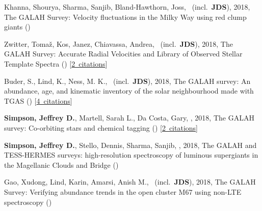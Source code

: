 \item[{\color{numcolor}\scriptsize6}] Khanna, Shourya, Sharma, Sanjib, Bland-Hawthorn, Joss, \etal\ (incl.\ \textbf{JDS}), 2018, The GALAH Survey: Velocity fluctuations in the Milky Way using red clump giants ()

\item[{\color{numcolor}\scriptsize5}] Zwitter, Toma{\v{z}}, Kos, Janez, Chiavassa, Andrea, \etal\ (incl.\ \textbf{JDS}), 2018, The GALAH Survey: Accurate Radial Velocities and Library of Observed Stellar Template Spectra () [\href{https://ui.adsabs.harvard.edu/#abs/2018arXiv180406344Z}{2~citations}]

\item[{\color{numcolor}\scriptsize4}] Buder, S., Lind, K., Ness, M. K., \etal\ (incl.\ \textbf{JDS}), 2018, The GALAH survey: An abundance, age, and kinematic inventory of the solar neighbourhood made with TGAS () [\href{https://ui.adsabs.harvard.edu/#abs/2018arXiv180405869B}{4~citations}]

\item[{\color{numcolor}\scriptsize3}] \textbf{Simpson, Jeffrey D.}, Martell, Sarah L., Da Costa, Gary, \etal, 2018, The GALAH survey: Co-orbiting stars and chemical tagging () [\href{https://ui.adsabs.harvard.edu/#abs/2018arXiv180405894S}{2~citations}]

\item[{\color{numcolor}\scriptsize2}] \textbf{Simpson, Jeffrey D.}, Stello, Dennis, Sharma, Sanjib, \etal, 2018, The GALAH and TESS-HERMES surveys: high-resolution spectroscopy of luminous supergiants in the Magellanic Clouds and Bridge ()

\item[{\color{numcolor}\scriptsize1}] Gao, Xudong, Lind, Karin, Amarsi, Anish M., \etal\ (incl.\ \textbf{JDS}), 2018, The GALAH Survey: Verifying abundance trends in the open cluster M67 using non-LTE spectroscopy ()